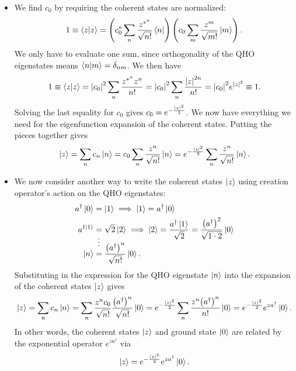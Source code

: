 \documentclass[11pt, a4paper]{article}
\begin{document}
\begin{itemize}
	\item We find $ c_{0} $ by requiring the coherent states are normalized:
	\begin{equation*}
		1 \equiv \braket{z}{z} = \left(c_{0}^{*} \sum_{n} \frac{z^{*^{n}}}{\sqrt{n!}}\bra{n}\right)\left(c_{0} \sum_{m} \frac{z^{m}}{\sqrt{m!}}\ket{m}\right).
	\end{equation*}
	We only have to evaluate one sum, since orthogonality of the QHO eigenstates means $ \braket{n}{m} = \delta_{nm} $. We then have
	\begin{equation*}
		1 \equiv \braket{z}{z} = \abs{c_{0}}^{2} \sum_{n}\frac{z^{*^{n}}z^{n}}{n!} = \abs{c_{0}}^{2}\sum_{n}\frac{\abs{z}^{2n}}{n!} = \abs{c_{0}}^{2}e^{\abs{z}^{2}} \equiv 1.
	\end{equation*}
	Solving the last equality for $ c_{0} $  gives $ c_{0} = e^{-\frac{\abs{z}^{2}}{2}} $. We now have everything we need for the eigenfunction expansion of the coherent states. Putting the pieces together gives
	\begin{equation*}
		\ket{z} =  \sum_{n}c_{n} \ket{n} = c_{0} \sum_{n} \frac{z^{n}}{\sqrt{n!}}\ket{n} = e^{-\frac{\abs{z}^{2}}{2}} \sum_{n}\frac{z^{n}}{\sqrt{n!}} \ket{n}.
	\end{equation*}
	
	\item We now consider another way to write the coherent states $ \ket{z} $ using creation operator's action on the QHO eigenstates:
	\begin{align*}
		a^{\dagger} \ket{0} &= \ket{1} \implies \ket{1} = a^{\dagger}\ket{0}\\
		a^{\dagger \ket{1}} &= \sqrt{2}\ket{2} \implies \ket{2} = \frac{a^{\dagger}\ket{1}}{\sqrt{2}} = \frac{\big(a^{\dagger}\big)^{2}}{\sqrt{1 \cdot 2}} \ket{0}\\[-4mm]
		&\ \, \vdots \\[-4mm]
		\ket{n} &= \frac{\big(a^{\dagger}\big)^{n}}{\sqrt{n!}} \ket{0}.
	\end{align*} 
	Substituting in the expression for the QHO eigenstate $ \ket{n} $ into the expansion of the coherent states $ \ket{z} $ gives
	\begin{equation*}
		\ket{z} = \sum_{n}c_{n}\ket{n} = \sum_{n}\frac{z^{n}c_{0}}{\sqrt{n!}} \frac{\big(a^{\dagger}\big)^{n}}{\sqrt{n!}} \ket{0} = e^{-\frac{\abs{z}^{2}}{2}} \sum_{n} \frac{z^{n}\big(a^{\dagger}\big)^{n}}{n!} \ket{0} =  e^{-\frac{\abs{z}^{2}}{2}}  e^{za^{\dagger}} \ket{0}.
	\end{equation*}
	In other words, the coherent states $ \ket{z} $ and ground state $ \ket{0} $ are related by the exponential operator $ e^{za^{\dagger}} $ via
	\begin{equation*}
		\ket{z} =  e^{-\frac{\abs{z}^{2}}{2}}  e^{za^{\dagger}} \ket{0}.
	\end{equation*}
	

\end{itemize}
\end{document}
